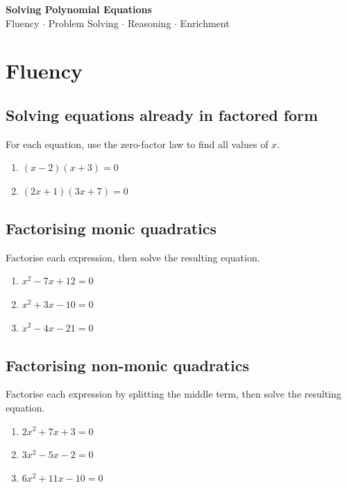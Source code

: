 \documentclass[11pt]{article}
\newcommand{\worksheettitle}{Solving Polynomial Equations}
\newcommand{\qspace}{\vspace{1.1cm}}
\begin{document}
\begin{center}
  {\Large\bfseries \worksheettitle}\\[0.3em]
  {\normalsize Fluency \(\cdot\) Problem Solving \(\cdot\) Reasoning \(\cdot\) Enrichment}
\end{center}

\vspace{0.5em}

\section{Fluency}

\subsection*{Solving equations already in factored form}
For each equation, use the zero-factor law to find all values of $x$.

\begin{enumerate}
  \item $(x-2)(x+3) = 0$
  \qspace
  \item $(2x+1)(3x+7) = 0$
  \qspace
\end{enumerate}

\subsection*{Factorising monic quadratics}
Factorise each expression, then solve the resulting equation.

\begin{enumerate}[resume]
  \item $x^2 - 7x + 12 = 0$
  \qspace
  \item $x^2 + 3x - 10 = 0$
  \qspace
  \item $x^2 - 4x - 21 = 0$
  \qspace
\end{enumerate}

\subsection*{Factorising non-monic quadratics}
Factorise each expression by splitting the middle term, then solve the resulting equation.

\begin{enumerate}[resume]
  \item $2x^2 + 7x + 3 = 0$
  \qspace
  \item $3x^2 - 5x - 2 = 0$
  \qspace
  \item $6x^2 + 11x - 10 = 0$
  \qspace
\end{enumerate}
\end{document}
